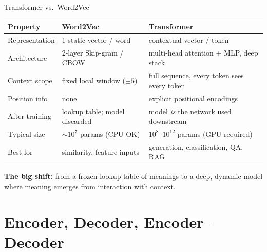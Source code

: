 \begin{frame}{Transformer vs.\ Word2Vec}
\begin{center}
\renewcommand{\arraystretch}{1.3}
\begin{tabular}{l l l}
\toprule
\textbf{Property} & \textbf{Word2Vec} & \textbf{Transformer} \\
\midrule
Representation & 1 static vector / word & contextual vector / token \\
Architecture & 2-layer Skip-gram / CBOW & multi-head attention + MLP, deep stack \\
Context scope & fixed local window ($\pm5$) & full sequence, every token sees every token \\
Position info & none & explicit positional encodings \\
After training & lookup table; model discarded & model \emph{is} the network used downstream \\
Typical size & $\sim10^{7}$ params (CPU OK) & $10^{8}$--$10^{12}$ params (GPU required) \\
Best for & similarity, feature inputs & generation, classification, QA, RAG \\
\bottomrule
\end{tabular}
\end{center}

\medskip
\textbf{The big shift:} from a frozen lookup table of meanings to a deep, dynamic model where meaning emerges from interaction with context.
\end{frame}

\section{Encoder, Decoder, Encoder--Decoder}

